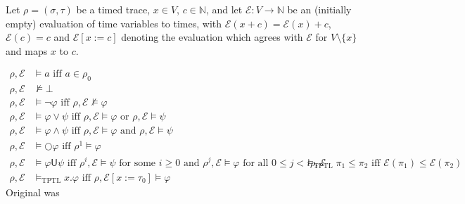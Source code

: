 \documentclass[a4paper]{article}
\newcommand{\U}{\mathsf{U}}
\newcommand{\tand}{\text{ and }}
\newcommand{\tor}{\text{ or }}
\newcommand{\tiff}{\text{ iff }}
\newcommand{\fsome}{\text{ for some }}
\newcommand{\fall}{\text{ for all }}
\newcommand{\eval}{\mathcal{E}}
\begin{document}
\begin{defn}\label{tptlsemfull}

  Let $\rho = (\sigma,\tau)$ be a timed trace, $x\in V$, $c\in\mathbb{N}$, and let $\eval:V\to\mathbb{N}$ be an (initially empty) evaluation of time variables to times, with $\eval(x + c) = \eval(x) + c$, $\eval(c) = c$ and $\eval[x:=c]$ denoting the evaluation which agrees with $\eval$ for $V\setminus\{x\}$ and maps $x$ to $c$.

  \begin{align*}
    \rho,\eval&\vDash a \tiff a \in \rho_0\\
    \rho,\eval&\nvDash \bot\\
    \rho,\eval&\vDash \neg \varphi \tiff \rho,\eval \nvDash \varphi\\
    \rho,\eval&\vDash \varphi \lor \psi \tiff \rho,\eval \vDash \varphi \tor \rho,\eval \vDash \psi\\
    \rho,\eval&\vDash \varphi \land \psi \tiff \rho,\eval \vDash \varphi \tand \rho,\eval \vDash \psi\\
    \rho,\eval&\vDash \bigcirc \varphi \tiff \rho^1 \vDash \varphi\\
    \rho,\eval&\vDash \varphi \U \psi \tiff \rho^i,\eval \vDash \psi \fsome i \geq 0 \tand \rho^j,\eval \vDash \varphi \fall 0 \leq j < i
    \rho,\eval &\vDash_{\text{TPTL}}\pi_1\leq\pi_2 \tiff \eval(\pi_1)\leq\eval(\pi_2)\\
    \rho,\eval &\vDash_{\text{TPTL}} x.\varphi \tiff \rho,\eval[x:=\tau_0]\vDash\varphi
  \end{align*}
  Original was 
\end{defn}
\end{document}

